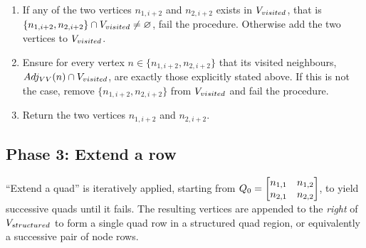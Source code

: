 \begin{enumerate}


\item If any of the two vertices $n_{1,i+2}$ and $n_{2,i+2}$ exists in $V_{visited}$, that is $\{ n_{1,i+2} , n_{2,i+2} \} \cap V_{visited} \neq \varnothing$, fail the procedure.
Otherwise add the two vertices to $V_{visited}$.

\item Ensure for every vertex $n \in \{ n_{1,i+2} , n_{2,i+2} \}$ that its visited neighbours, $Adj_{VV}(n) \cap V_{visited}$, are exactly those explicitly stated above. If this is not the case, remove $\{ n_{1,i+2} , n_{2,i+2} \}$ from $V_{visited}$ and fail the procedure.

\item Return the two vertices $n_{1,i+2}$ and $n_{2,i+2}$.
\end{enumerate}








\subsection{Phase 3: Extend a row}
``Extend a quad'' is iteratively applied, starting from $Q_0 = \begin{bmatrix} n_{1,1} & n_{1,2} \\ n_{2,1} & n_{2,2} \end{bmatrix}$, to yield successive quads until it fails.
The resulting vertices are appended to the \emph{right} of $V_{structured}$ to form a single quad row in a structured quad region, or equivalently a successive pair of node rows.


